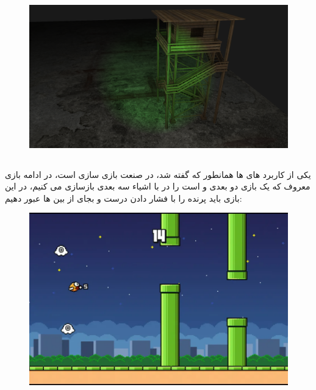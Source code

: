 \documentclass[a4paper, 12pt]{report}
\begin{document}
\begin{figure}[H]
    \centering
    \href{https://github.com/devprofile98/shm}{
        \includegraphics[width=13cm]{images/archerys3d.png}
    }
    \caption{\fontsize{11pt}{1.0cm}\zarbold\textbf{}}
    \label{fig:my_label}
\end{figure}

    \newpage
    \subsection{}
    یکی از کاربرد های  ها همانطور که گفته شد، در صنعت بازی سازی است، در ادامه بازی معروف  که یک بازی دو بعدی و  است را در با اشیاء سه بعدی بازسازی می کنیم، در این بازی باید پرنده را با فشار دادن درست و بجای  از بین  ها عبور دهیم:

\begin{figure}[H]
    \centering
    \href{https://flappybird.io/}{
        \includegraphics[width=13cm]{images/op-flappybird.png}
    }
    \caption{\fontsize{11pt}{1.0cm}\zarbold\textbf{}}
    \label{fig:my_label}
\end{figure}
\end{document}
